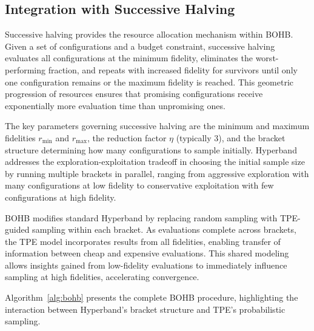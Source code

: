 \subsection{Integration with Successive Halving}
\label{subsec:successive_halving}

Successive halving provides the resource allocation mechanism within BOHB. Given a set of configurations and a budget constraint, successive halving evaluates all configurations at the minimum fidelity, eliminates the worst-performing fraction, and repeats with increased fidelity for survivors until only one configuration remains or the maximum fidelity is reached. This geometric progression of resources ensures that promising configurations receive exponentially more evaluation time than unpromising ones.

The key parameters governing successive halving are the minimum and maximum fidelities $r_{\min}$ and $r_{\max}$, the reduction factor $\eta$ (typically 3), and the bracket structure determining how many configurations to sample initially. Hyperband addresses the exploration-exploitation tradeoff in choosing the initial sample size by running multiple brackets in parallel, ranging from aggressive exploration with many configurations at low fidelity to conservative exploitation with few configurations at high fidelity.

BOHB modifies standard Hyperband by replacing random sampling with TPE-guided sampling within each bracket. As evaluations complete across brackets, the TPE model incorporates results from all fidelities, enabling transfer of information between cheap and expensive evaluations. This shared modeling allows insights gained from low-fidelity evaluations to immediately influence sampling at high fidelities, accelerating convergence.

Algorithm~\ref{alg:bohb} presents the complete BOHB procedure, highlighting the interaction between Hyperband's bracket structure and TPE's probabilistic sampling.

